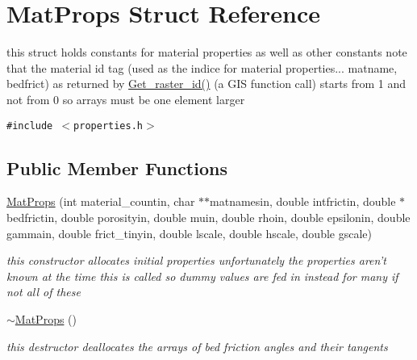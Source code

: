 \hypertarget{structMatProps}{
\section{Mat\-Props Struct Reference}
\label{structMatProps}
}
this struct holds constants for material properties as well as other constants note that the material id tag (used as the indice for material properties... matname, bedfrict) as returned by \hyperlink{GisApi_8C_a69}{Get\_\-raster\_\-id()} (a GIS function call) starts from 1 and not from 0 so arrays must be one element larger  


{\tt \#include $<$properties.h$>$}

\subsection*{Public Member Functions}
\begin{CompactItemize}
\item 
\hyperlink{structMatProps_a0}{Mat\-Props} (int material\_\-countin, char $\ast$$\ast$matnamesin, double intfrictin, double $\ast$bedfrictin, double porosityin, double muin, double rhoin, double epsilonin, double gammain, double frict\_\-tinyin, double lscale, double hscale, double gscale)
\begin{CompactList}\small\item\em this constructor allocates initial properties unfortunately the properties aren't known at the time this is called so dummy values are fed in instead for many if not all of these \item\end{CompactList}\item 
\hyperlink{structMatProps_a1}{$\sim$Mat\-Props} ()
\begin{CompactList}\small\item\em this destructor deallocates the arrays of bed friction angles and their tangents \item\end{CompactList}\end{CompactItemize}
